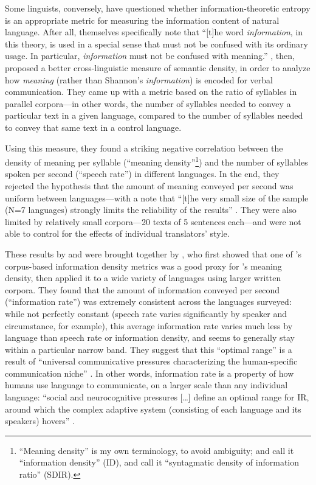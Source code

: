 \documentclass[12pt,twoside]{article}
\begin{document}
Some linguists, conversely, have questioned whether information-theoretic entropy is an appropriate metric for measuring the information content of natural language. After all, \citet[8]{shannon} themselves specifically note that ``[t]he word \emph{information}, in this theory, is used in a special sense that must not be confused with its ordinary usage. In particular, \emph{information} must not be confused with meaning.'' \citet{pellegrino}, then, proposed a better cross-linguistic measure of semantic density, in order to analyze how \emph{meaning} (rather than Shannon's \emph{information}) is encoded for verbal communication. They came up with a metric based on the ratio of syllables in parallel corpora---in other words, the number of syllables needed to convey a particular text in a given language, compared to the number of syllables needed to convey that same text in a control language.

Using this measure, they found a striking negative correlation between the density of meaning per syllable (``meaning density''\footnote{``Meaning density'' is my own terminology, to avoid ambiguity; \citet{pellegrino} and \citet{oh} call it ``information density'' (ID), and \citet{coupé} call it ``syntagmatic density of information ratio'' (SDIR).}) and the number of syllables spoken per second (``speech rate'') in different languages. In the end, they rejected the hypothesis that the amount of meaning conveyed per second was uniform between languages---with a note that ``[t]he very small size of the sample (N=7 languages) strongly limits the reliability of the results'' \citep[550]{pellegrino}. They were also limited by relatively small corpora---20 texts of 5 sentences each---and were not able to control for the effects of individual translators' style.

These results by \citet{oh} and \citet{pellegrino} were brought together by \citet{coupé}, who first showed that one of \citeauthor{oh}'s corpus-based information density metrics was a good proxy for \citeauthor{pellegrino}'s meaning density, then applied it to a wide variety of languages using larger written corpora. They found that the amount of information conveyed per second (``information rate'') was extremely consistent across the languages surveyed: while not perfectly constant (speech rate varies significantly by speaker and circumstance, for example), this average information rate varies much less by language than speech rate or information density, and seems to generally stay within a particular narrow band. They suggest that this ``optimal range'' is a result of ``universal communicative pressures characterizing the human-specific communication niche'' \citep[6]{coupé}. In other words, information rate is a property of how humans use language to communicate, on a larger scale than any individual language: ``social and neurocognitive pressures [\ldots] define an optimal range for IR, around which the complex adaptive system (consisting of each language and its speakers) hovers'' \citep[6]{coupé}.
\end{document}
